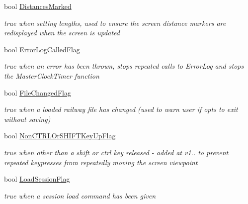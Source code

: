 \begin{DoxyCompactItemize}
bool \mbox{\hyperlink{class_t_interface_adfaa3df9168b5f57613e4ff8b1fbf1fe}{Distances\+Marked}}
\begin{DoxyCompactList}\small\item\em true when setting lengths, used to ensure the screen distance markers are redisplayed when the screen is updated \end{DoxyCompactList}\item 
\mbox{\label{class_t_interface_ac7c8e04745f4dcceab3e27ef47b1d565}} 
bool \mbox{\hyperlink{class_t_interface_ac7c8e04745f4dcceab3e27ef47b1d565}{Error\+Log\+Called\+Flag}}
\begin{DoxyCompactList}\small\item\em true when an error has been thrown, stops repeated calls to Error\+Log and stops the Master\+Clock\+Timer function \end{DoxyCompactList}\item 
\mbox{\label{class_t_interface_a0ae4657a7b055d164555b47d28853768}} 
bool \mbox{\hyperlink{class_t_interface_a0ae4657a7b055d164555b47d28853768}{File\+Changed\+Flag}}
\begin{DoxyCompactList}\small\item\em true when a loaded railway file has changed (used to warn user if opts to exit without saving) \end{DoxyCompactList}\item 
\mbox{\label{class_t_interface_ab3848e35090c474e8417d5965d742f00}} 
bool \mbox{\hyperlink{class_t_interface_ab3848e35090c474e8417d5965d742f00}{Non\+C\+T\+R\+L\+Or\+S\+H\+I\+F\+T\+Key\+Up\+Flag}}
\begin{DoxyCompactList}\small\item\em true when other than a shift or ctrl key released -\/ added at v1.. to prevent repeated keypresses from repeatedly moving the screen viewpoint \end{DoxyCompactList}\item 
\mbox{\label{class_t_interface_af3993b4e6df41be961178245388220dc}} 
bool \mbox{\hyperlink{class_t_interface_af3993b4e6df41be961178245388220dc}{Load\+Session\+Flag}}
\begin{DoxyCompactList}\small\item\em true when a session load command has been given \end{DoxyCompactList}\item 

\end{DoxyCompactItemize}
